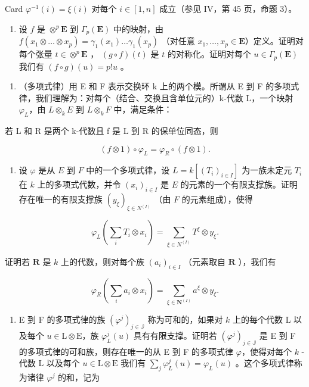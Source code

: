 Card \(\varphi^{-1}(i) = \xi(i)\) 对每个 \(i \in [1, n]\) 成立（参见 IV，第 45 页，命题 3）。

\begin{enumerate}
\def\labelenumi{\alph{enumi})}
\setcounter{enumi}{2}
\tightlist
\item
  设 \(f\) 是 \(\otimes^p \mathbf{E}\) 到 \(\Gamma_p(\mathbf{E})\) 中的映射，由 \(f(x_1 \otimes \ldots \otimes x_p) = \gamma_1(x_1) \ldots \gamma_1(x_p)\) （对任意 \(x_1, \ldots, x_p \in \mathbf{E}\)）定义。证明对每个张量 \(t \in \otimes^p \mathbf{E}\) ， \((g \circ f)(t)\) 是 \(t\) 的对称化。证明对每个 \(u \in \Gamma_p(\mathbf{E})\) 我们有 \((f \circ g)(u) = p! u\) 。
\end{enumerate}

\begin{enumerate}
\def\labelenumi{\arabic{enumi})}
\setcounter{enumi}{8}
\tightlist
\item
  （多项式律）用 E 和 F 表示交换环 k 上的两个模。所谓从 E 到 F 的多项式律，我们理解为：对每个（结合、交换且含单位元的）k-代数 L，一个映射 \(\varphi_{L}\)，由 \(L \otimes_{k} E\) 到 \(L \otimes_{k} F\) 中，满足条件：
\end{enumerate}

若 L 和 R 是两个 k-代数且 f 是 L 到 R 的保单位同态，则

\[
(f \otimes 1) \circ \varphi_ {L} = \varphi_ {R} \circ (f \otimes 1).
\]

\begin{enumerate}
\def\labelenumi{\alph{enumi})}
\tightlist
\item
  设 \(\varphi\) 是从 \(E\) 到 \(F\) 中的一个多项式律，设 \(L = k[(T_i)_{i \in I}]\) 为一族未定元 \(T_i\) 在 \(k\) 上的多项式代数，并令 \((x_i)_{i \in I}\) 是 \(E\) 的元素的一个有限支撑族。证明存在唯一的有限支撑族 \((y_\xi)_{\xi \in N^{(I)}}\) （由 \(F\) 的元素组成），使得
\end{enumerate}

\[
\varphi_ {L} \left(\sum_ {i} T _ {i} \otimes x _ {i}\right) = \sum_ {\xi \in N ^ {(I)}} T ^ {\xi} \otimes y _ {\xi}.
\]

证明若 \(\mathbf{R}\) 是 \(k\) 上的代数，则对每个族 \((a_i)_{i \in I}\) （元素取自 \(\mathbf{R}\) ），我们有

\[
\varphi_ {R} \left(\sum_ {i} a _ {i} \otimes x _ {i}\right) = \sum_ {\xi \in \mathbf {N} ^ {(I)}} a ^ {\xi} \otimes y _ {\xi}.\tag{1}
\]

\begin{enumerate}
\def\labelenumi{\alph{enumi})}
\setcounter{enumi}{1}
\tightlist
\item
  E 到 F 的多项式律的族 \((\varphi^j)_{j \in \mathbb{J}}\) 称为可和的，如果对 \(k\) 上的每个代数 L 以及每个 \(u \in \mathrm{L} \otimes \mathrm{E}\)，族 \(\varphi_L^j(u)\) 具有有限支撑。证明若 \((\varphi^j)_{j \in \mathbb{J}}\) 是 E 到 F 的多项式律的可和族，则存在唯一的从 E 到 F 的多项式律 \(\varphi\)，使得对每个 \(k\) -代数 L 以及每个 \(u \in \mathrm{L} \otimes \mathrm{E}\) 我们有 \(\sum_j \varphi_L^j(u) = \varphi_L(u)\) 。这个多项式律称为诸律 \(\varphi^j\) 的和，记为
\end{enumerate}

